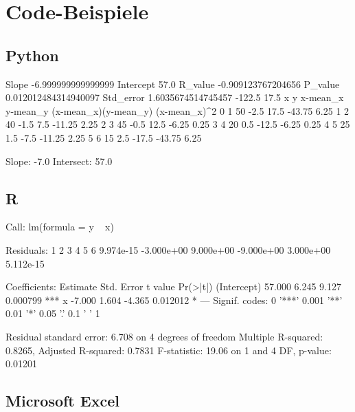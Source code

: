 \documentclass[ngerman, 12pt]{scrartcl}
\begin{document}
\section{Code-Beispiele}


\subsection{Python}




\begin{ausgabe}
Slope -6.999999999999999
Intercept 57.0
R_value -0.909123767204656
P_value 0.012012484314940097
Std_error 1.6035674514745457
-122.5 17.5
   x   y  x-mean_x  y-mean_y  (x-mean_x)(y-mean_y)  (x-mean_x)^2
0  1  50      -2.5      17.5                -43.75          6.25
1  2  40      -1.5       7.5                -11.25          2.25
2  3  45      -0.5      12.5                 -6.25          0.25
3  4  20       0.5     -12.5                 -6.25          0.25
4  5  25       1.5      -7.5                -11.25          2.25
5  6  15       2.5     -17.5                -43.75          6.25 

Slope:  -7.0 
Intersect:  57.0
\end{ausgabe}

\subsection{R}




\begin{ausgabe}
Call:
lm(formula = y ~ x)

Residuals:
         1          2          3          4          5          6 
 9.974e-15 -3.000e+00  9.000e+00 -9.000e+00  3.000e+00  5.112e-15 

Coefficients:
            Estimate Std. Error t value Pr(>|t|)    
(Intercept)   57.000      6.245   9.127 0.000799 ***
x             -7.000      1.604  -4.365 0.012012 *  
---
Signif. codes:  0 '***' 0.001 '**' 0.01 '*' 0.05 '.' 0.1 ' ' 1

Residual standard error: 6.708 on 4 degrees of freedom
Multiple R-squared:  0.8265,	Adjusted R-squared:  0.7831 
F-statistic: 19.06 on 1 and 4 DF,  p-value: 0.01201
\end{ausgabe}

\subsection{Microsoft Excel}
\end{document}
